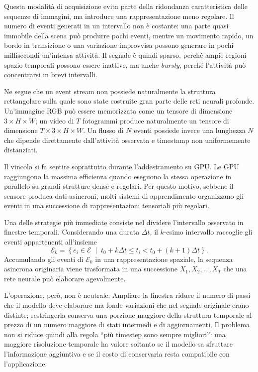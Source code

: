 Questa modalità di acquisizione evita parte della ridondanza caratteristica delle sequenze di immagini, ma introduce una rappresentazione meno regolare. Il numero di eventi generati in un intervallo non è costante: una parte quasi immobile della scena può produrre pochi eventi, mentre un movimento rapido, un bordo in transizione o una variazione improvvisa possono generare in pochi millisecondi un'intensa attività. Il segnale è quindi sparso, perché ampie regioni spazio-temporali possono essere inattive, ma anche \emph{bursty}, perché l'attività può concentrarsi in brevi intervalli.

Ne segue che un event stream non possiede naturalmente la struttura rettangolare sulla quale sono state costruite gran parte delle reti neurali profonde. Un'immagine RGB può essere memorizzata come un tensore di dimensione $3 \times H \times W$; un video di $T$ fotogrammi produce naturalmente un tensore di dimensione $T \times 3 \times H \times W$. Un flusso di $N$ eventi possiede invece una lunghezza $N$ che dipende direttamente dall'attività osservata e timestamp non uniformemente distanziati.

Il vincolo si fa sentire soprattutto durante l'addestramento su GPU. Le GPU raggiungono la massima efficienza quando eseguono la stessa operazione in parallelo su grandi strutture dense e regolari. Per questo motivo, sebbene il sensore produca dati asincroni, molti sistemi di apprendimento organizzano gli eventi in una successione di rappresentazioni tensoriali più regolari.

Una delle strategie più immediate consiste nel dividere l'intervallo osservato in finestre temporali. Considerando una durata $\Delta t$, il $k$-esimo intervallo raccoglie gli eventi appartenenti all'insieme
\begin{equation}
\label{eq:binning_temporale}
\mathcal{E}_k = \left\{ e_i \in \mathcal{E} \;\middle|\; t_0 + k\Delta t \leq t_i < t_0 + (k+1)\Delta t \right\}.
\end{equation}
Accumulando gli eventi di $\mathcal{E}_k$ in una rappresentazione spaziale, la sequenza asincrona originaria viene trasformata in una successione $X_1, X_2, \dots, X_T$ che una rete neurale può elaborare agevolmente.

L'operazione, però, non è neutrale. Ampliare la finestra riduce il numero di passi che il modello deve elaborare ma fonde variazioni che nel segnale originale erano distinte; restringerla conserva una porzione maggiore della struttura temporale al prezzo di un numero maggiore di stati intermedi e di aggiornamenti. Il problema non si riduce quindi alla regola ``più timestep sono sempre migliori'': una maggiore risoluzione temporale ha valore soltanto se il modello sa sfruttare l'informazione aggiuntiva e se il costo di conservarla resta compatibile con l'applicazione.

